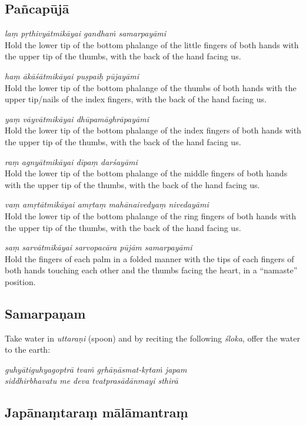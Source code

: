 \documentclass[11pt,oneside,a4paper]{article}
\newenvironment{shloka}[1]
  {\bigskip\center#1\varwidth{\linewidth}}
  {\endvarwidth\endcenter\bigskip}
\newcommand{\tl}[1]{\emph{#1}}
\begin{document}
\subsection{Pañcapūjā}

\tl{laṃ pṛthivyātmikāyai gandhaṁ samarpayāmi}\\
Hold the lower tip of the bottom phalange of the little fingers of both hands
with the upper tip of the thumbs, with the back of the hand facing us.

\tl{haṃ ākāśātmikāyai puṣpaiḥ pūjayāmi}\\
Hold the lower tip of the bottom phalange of the thumbs of both hands with
the upper tip/nails of the index fingers, with the back of the hand facing us.

\tl{yaṃ vāyvātmikāyai dhūpamāghrāpayāmi}\\
Hold the lower tip of the bottom phalange of the index fingers of both hands
with the upper tip of the thumbs, with the back of the hand facing us.

\tl{raṃ agnyātmikāyai dīpaṃ darśayāmi}\\
Hold the lower tip of the bottom phalange of the middle fingers of both hands
with the upper tip of the thumbs, with the back of the hand facing us.

\tl{vaṃ amṛtātmikāyai amṛtaṃ mahānaivedyaṃ nivedayāmi}\\
Hold the lower tip of the bottom phalange of the ring fingers of both hands with
the upper tip of the thumbs, with the back of the hand facing us.

\tl{saṃ sarvātmikāyai sarvopacāra pūjām samarpayāmi}\\
Hold the fingers of each palm in a folded manner with the tips of each fingers
of both hands touching each other and the thumbs facing the heart, in
a ``namaste'' position.

\subsection{Samarpaṇam}

Take water in \tl{uttaraṇi} (spoon) and by reciting the following \tl{śloka},
offer the water to the earth:

\begin{shloka}\itshape
  guhyātiguhyagoptrā tvaṁ gṛhāṇāsmat-kṛtaṁ japam\\
  siddhirbhavatu me deva tvatprasādānmayi sthirā
\end{shloka}

\subsection{Japānaṃtaraṃ mālāmantraṃ}
\end{document}
